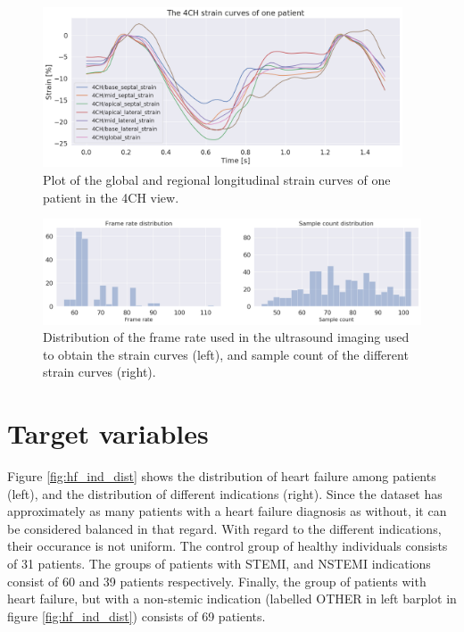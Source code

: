 \begin{figure}[h]
    \begin{center}
    \includegraphics[width=0.95\textwidth]{data-exp/patient_strain_curves_4CH.png}
    \end{center}
    \caption{Plot of the global and regional longitudinal strain curves of one patient in the 4CH view.}
    \label{fig:strain_curves}
\end{figure}

\begin{figure}
    \begin{center}
    \includegraphics[width=\textwidth]{data-exp/fr_sample_dist.png}
    \end{center}
    \caption{Distribution of the frame rate used in the ultrasound imaging used to obtain the strain curves (left), and sample count of the different strain curves (right).}
    \label{fig:fr_sample_dist}
\end{figure}

\newpage

\section{Target variables} \label{sec:target}
Figure \ref{fig:hf_ind_dist} shows the distribution of heart failure among patients (left), and the distribution of different indications (right). Since the dataset has approximately as many patients with a heart failure diagnosis as without, it can be considered balanced in that regard. With regard to the different indications, their occurance is not uniform. The control group of healthy individuals consists of 31 patients. The groups of patients with STEMI, and NSTEMI indications consist of 60 and 39 patients respectively. Finally, the group of patients with heart failure, but with a non-stemic indication (labelled OTHER in left barplot in figure \ref{fig:hf_ind_dist}) consists of 69 patients. \bigskip

